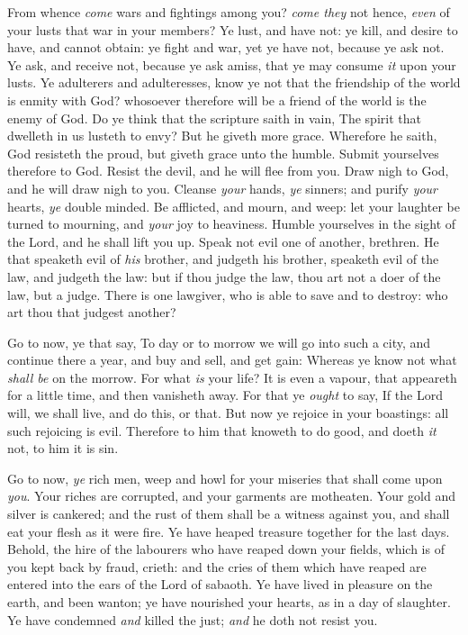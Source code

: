 \documentclass[11pt,letterpaper,oneside]{memoir}
\begin{document}
From whence \emph{come} wars and fightings among you? \emph{come they} not hence, 
\emph{even} of your lusts that war in your members? Ye lust, and have not: ye 
kill, and desire to have, and cannot obtain: ye fight and war, yet ye 
have not, because ye ask not. Ye ask, and receive not, because ye ask 
amiss, that ye may consume \emph{it} upon your lusts. Ye adulterers and 
adulteresses, know ye not that the friendship of the world is enmity 
with God? whosoever therefore will be a friend of the world is the enemy 
of God. Do ye think that the scripture saith in vain, The spirit that 
dwelleth in us lusteth to envy? But he giveth more grace. Wherefore he 
saith, God resisteth the proud, but giveth grace unto the humble. Submit 
yourselves therefore to God. Resist the devil, and he will flee from 
you. Draw nigh to God, and he will draw nigh to you. Cleanse \emph{your} 
hands, \emph{ye} sinners; and purify \emph{your} hearts, \emph{ye} double minded. Be 
afflicted, and mourn, and weep: let your laughter be turned to mourning, 
and \emph{your} joy to heaviness. Humble yourselves in the sight of the Lord, 
and he shall lift you up. Speak not evil one of another, brethren. He 
that speaketh evil of \emph{his} brother, and judgeth his brother, speaketh 
evil of the law, and judgeth the law: but if thou judge the law, thou 
art not a doer of the law, but a judge. There is one lawgiver, who is 
able to save and to destroy: who art thou that judgest another? 

Go to now, ye that say, To day or to morrow we will go into such a city, 
and continue there a year, and buy and sell, and get gain: Whereas ye 
know not what \emph{shall be} on the morrow. For what \emph{is} your life? It is 
even a vapour, that appeareth for a little time, and then vanisheth 
away. For that ye \emph{ought} to say, If the Lord will, we shall live, and 
do this, or that. But now ye rejoice in your boastings: all such 
rejoicing is evil. Therefore to him that knoweth to do good, and doeth 
\emph{it} not, to him it is sin. 

Go to now, \emph{ye} rich men, weep and howl for your miseries that shall 
come upon \emph{you}. Your riches are corrupted, and your garments are 
motheaten. Your gold and silver is cankered; and the rust of them shall 
be a witness against you, and shall eat your flesh as it were fire. Ye 
have heaped treasure together for the last days. Behold, the hire of the 
labourers who have reaped down your fields, which is of you kept back by 
fraud, crieth: and the cries of them which have reaped are entered into 
the ears of the Lord of sabaoth. Ye have lived in pleasure on the earth, 
and been wanton; ye have nourished your hearts, as in a day of 
slaughter. Ye have condemned \emph{and} killed the just; \emph{and} he doth not 
resist you. 
\end{document}
